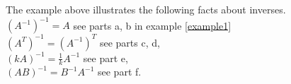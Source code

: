\documentclass{ximera}
\begin{document}
The example above illustrates the following facts about inverses. \\
$\left(A^{-1}\right)^{-1}=A$ \hspace{2cm} see parts a, b in example \ref{example1}\\
$\left(A^{T}\right)^{-1}= \left(A^{-1}\right)^{T}$ \hspace{2cm} see parts c, d, \\
$\left(kA\right)^{-1}= \frac{1}{k}A^{-1}$ \hspace{2cm} see part e,\\
$(AB)^{-1}= B^{-1}A^{-1}$ \hspace{2cm} see part f. 
\end{document}
